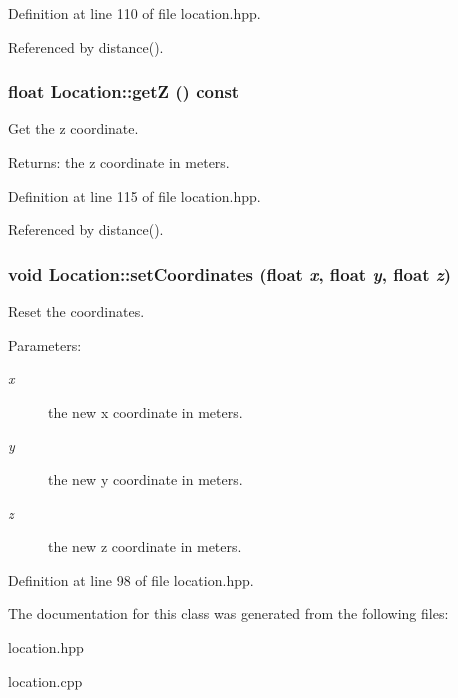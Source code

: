 Definition at line 110 of file location.hpp.

Referenced by distance().
\subsubsection{\setlength{\rightskip}{0pt plus 5cm}float Location::get\-Z () const\hspace{0.3cm}{\tt  [inline]}}\label{classLocation_a4e1c298e3f7cbe6659af6320e6de50a}


Get the z coordinate. 

\begin{Desc}
\item[Returns:]the z coordinate in meters. \end{Desc}


Definition at line 115 of file location.hpp.

Referenced by distance().
\subsubsection{\setlength{\rightskip}{0pt plus 5cm}void Location::set\-Coordinates (float {\em x}, float {\em y}, float {\em z})\hspace{0.3cm}{\tt  [inline]}}\label{classLocation_cf1453cf1c6555cbe0724d639696755d}


Reset the coordinates. 

\begin{Desc}
\item[Parameters:]
\begin{description}
\item[{\em x}]the new x coordinate in meters. \item[{\em y}]the new y coordinate in meters. \item[{\em z}]the new z coordinate in meters. \end{description}
\end{Desc}


Definition at line 98 of file location.hpp.

The documentation for this class was generated from the following files:\begin{CompactItemize}
\item 
location.hpp\item 
location.cpp\end{CompactItemize}
